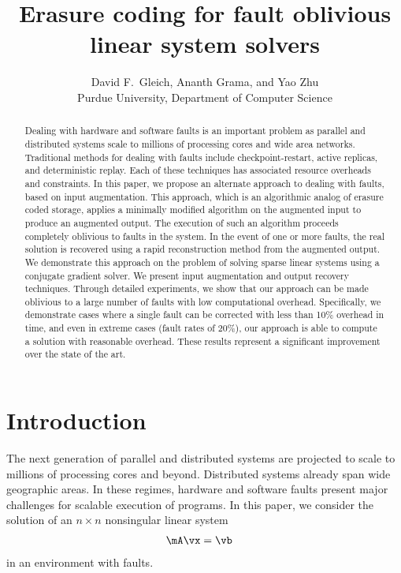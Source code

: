 \documentclass[11pt]{article}
\title{Erasure coding for fault oblivious linear system solvers}
\author{David F.~Gleich, Ananth Grama, and Yao Zhu\\
Purdue University, Department of Computer Science}
\makeatletter
\def\blfootnote{\xdef\@thefnmark{}\@footnotetext}
\makeatother
\begin{document}
\date{}
\maketitle

\blfootnote{~}
\begin{abstract} 
Dealing with hardware and software faults is an important problem
as parallel and distributed systems scale to millions of processing cores
and wide area networks. Traditional methods for dealing with faults include
checkpoint-restart, active replicas, and deterministic replay. Each of these
techniques has associated resource overheads and constraints. In this paper, we
propose an alternate approach to dealing with faults, based on input augmentation.
This approach, which is an algorithmic analog of erasure coded storage, applies a
minimally modified algorithm on the augmented input to produce an augmented output.
The execution of such an algorithm proceeds completely oblivious to faults
in the system. In the event of one or more faults, the real solution is recovered
using a rapid reconstruction method from the augmented output. We demonstrate this
approach on the problem of solving sparse linear systems using a conjugate gradient
solver. We present input augmentation and output recovery techniques. Through detailed
experiments, we show that our approach can be made oblivious to a large number of
faults with low computational overhead. Specifically, we demonstrate cases where
a single fault can be corrected with less than 10\% overhead in time, and 
even in extreme cases (fault rates of 20\%), our approach is able to compute a solution
with reasonable overhead. These results represent a significant improvement over
the state of the art.
\end{abstract}

\section{Introduction}

The next generation of parallel and distributed systems are projected to scale to
millions of processing cores and beyond. Distributed systems already span wide
geographic areas. In these regimes, hardware and software faults present major
challenges for scalable execution of programs. In this paper, we consider the
solution of an $n\times n$ nonsingular linear system
\begin{align}
\mA \vx&= \vb
\label{eq:raw-linear-system}
\end{align}
in an environment with faults.
\end{document}

